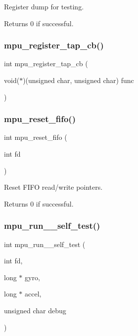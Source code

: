 Register dump for testing. 

\begin{DoxyReturn}{Returns}
0 if successful. 
\end{DoxyReturn}
\mbox{\label{group___d_r_i_v_e_r_s_ga0d528114a4e355a10ffd354a4c89a17f}} 
\subsubsection{mpu\+\_\+register\+\_\+tap\+\_\+cb()}
{\footnotesize\ttfamily int mpu\+\_\+register\+\_\+tap\+\_\+cb (\begin{DoxyParamCaption}\item[{void($\ast$)(unsigned char, unsigned char)}]{func }\end{DoxyParamCaption})}

\mbox{\label{group___d_r_i_v_e_r_s_ga6a36d2a1bcd86cb3efa15d0ff2de72d7}} 
\subsubsection{mpu\+\_\+reset\+\_\+fifo()}
{\footnotesize\ttfamily int mpu\+\_\+reset\+\_\+fifo (\begin{DoxyParamCaption}\item[{int}]{fd }\end{DoxyParamCaption})}



Reset F\+I\+FO read/write pointers. 

\begin{DoxyReturn}{Returns}
0 if successful. 
\end{DoxyReturn}
\mbox{\label{group___d_r_i_v_e_r_s_ga14b451d62f21abc7099394219dcdadce}} 
\subsubsection{mpu\+\_\+run\+\_\+\_\+self\+\_\+test()}
{\footnotesize\ttfamily int mpu\+\_\+run\+\_\+\_\+self\+\_\+test (\begin{DoxyParamCaption}\item[{int}]{fd,  }\item[{long $\ast$}]{gyro,  }\item[{long $\ast$}]{accel,  }\item[{unsigned char}]{debug }\end{DoxyParamCaption})}

